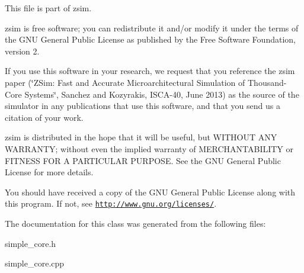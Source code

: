 This file is part of zsim.

zsim is free software; you can redistribute it and/or modify it under the terms of the G\-N\-U General Public License as published by the Free Software Foundation, version 2.

If you use this software in your research, we request that you reference the zsim paper (\char`\"{}\-Z\-Sim\-: Fast and Accurate Microarchitectural Simulation of
\-Thousand-\/\-Core Systems\char`\"{}, Sanchez and Kozyrakis, I\-S\-C\-A-\/40, June 2013) as the source of the simulator in any publications that use this software, and that you send us a citation of your work.

zsim is distributed in the hope that it will be useful, but W\-I\-T\-H\-O\-U\-T A\-N\-Y W\-A\-R\-R\-A\-N\-T\-Y; without even the implied warranty of M\-E\-R\-C\-H\-A\-N\-T\-A\-B\-I\-L\-I\-T\-Y or F\-I\-T\-N\-E\-S\-S F\-O\-R A P\-A\-R\-T\-I\-C\-U\-L\-A\-R P\-U\-R\-P\-O\-S\-E. See the G\-N\-U General Public License for more details.

You should have received a copy of the G\-N\-U General Public License along with this program. If not, see \href{http://www.gnu.org/licenses/}{\tt http\-://www.\-gnu.\-org/licenses/}. 

The documentation for this class was generated from the following files\-:\begin{DoxyCompactItemize}
\item 
simple\-\_\-core.\-h\item 
simple\-\_\-core.\-cpp\end{DoxyCompactItemize}

